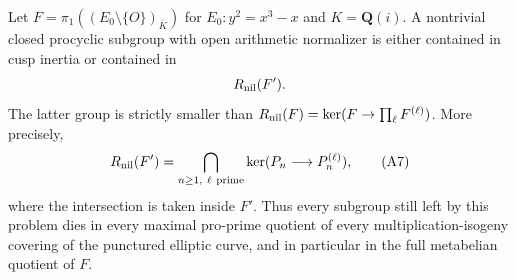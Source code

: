 \begin{proposition}
\label{A:deeper-common-kernel}
Let $F=\pi_1((E_0\setminus\{O\})_{\overline K})$
for $E_0:y^2=x^3-x$ and $K=\mathbf Q(i)$.
A nontrivial closed procyclic subgroup with open
arithmetic normalizer is either contained in cusp
inertia or contained in
\[
                         R_{\rm nil}(F').
\]
The latter group is strictly smaller than
$R_{\rm nil}(F)=\ker(F\to\prod_\ell F^{(\ell)})$.
More precisely,
\[
 R_{\rm nil}(F')
   =\bigcap_{n\ge1,\ \ell\ \mathrm{prime}}
                   \ker(P_n\longrightarrow P_n^{(\ell)}),
                                                               \tag{A7}
\]
where the intersection is taken inside $F'$.
Thus every subgroup still left by this problem dies
in every maximal pro-prime quotient of every
multiplication-isogeny covering of the punctured
elliptic curve, and in particular in the full
metabelian quotient of $F$.
\end{proposition}
